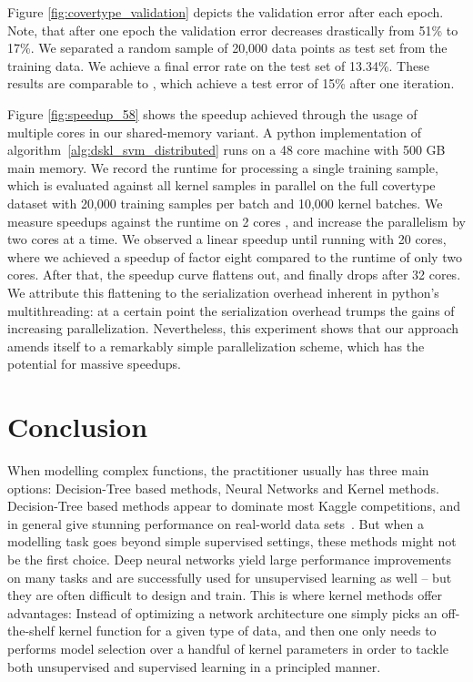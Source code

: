 \documentclass{article} %
\newcommand{\sebastian}[1]{\textcolor{red}{{\bf Sebastian:} #1}}
\begin{document}
Figure \ref{fig:covertype_validation} depicts the validation error after each epoch. Note, that after one epoch the validation error decreases drastically from 51\% to 17\%. We separated a random sample of 20,000 data points as test set from the training data. We achieve a final error rate on the test set of 13.34\%. 
These results are comparable to \cite{Dai2014}, which achieve a test error of 15\% after one iteration. 

Figure \ref{fig:speedup_58} shows the speedup achieved through the usage of multiple cores in our shared-memory variant. A python implementation of algorithm~\autoref{alg:dskl_svm_distributed} runs on a 48 core machine with 500 GB main memory. We record the runtime for processing a single training sample, which is evaluated against all kernel samples in parallel on the full covertype dataset with 20,000 training samples per batch and 10,000 kernel batches. We measure speedups against the runtime on 2 cores 
, and increase the parallelism by two cores at a time. We observed a linear speedup until running with 20 cores, where we achieved a speedup of factor eight compared to the runtime of only two cores. After that, the speedup curve flattens out, and finally drops after 32 cores. We attribute this flattening to the serialization overhead inherent in python's multithreading: at a certain point the serialization overhead trumps the gains of increasing parallelization. Nevertheless, this experiment shows that our approach amends itself to a remarkably simple parallelization scheme, which has the potential for massive speedups.

\section{Conclusion}
When modelling complex functions, the practitioner usually has three main options: Decision-Tree based methods, Neural Networks and Kernel methods. Decision-Tree based methods appear to dominate most Kaggle competitions, and in general give stunning performance on real-world data sets~\cite{Caruana2006}. But when a modelling task goes beyond simple supervised settings, these methods might not be the first choice. Deep neural networks yield large performance improvements on many tasks and are successfully used for unsupervised learning as well -- but they are often difficult to design and train. 
This is where kernel methods offer advantages: Instead of optimizing a network architecture one simply picks an off-the-shelf kernel function for a given type of data, and then one only needs to performs model selection over a handful of kernel parameters in order to tackle both unsupervised and supervised learning in a principled manner.
\end{document}
